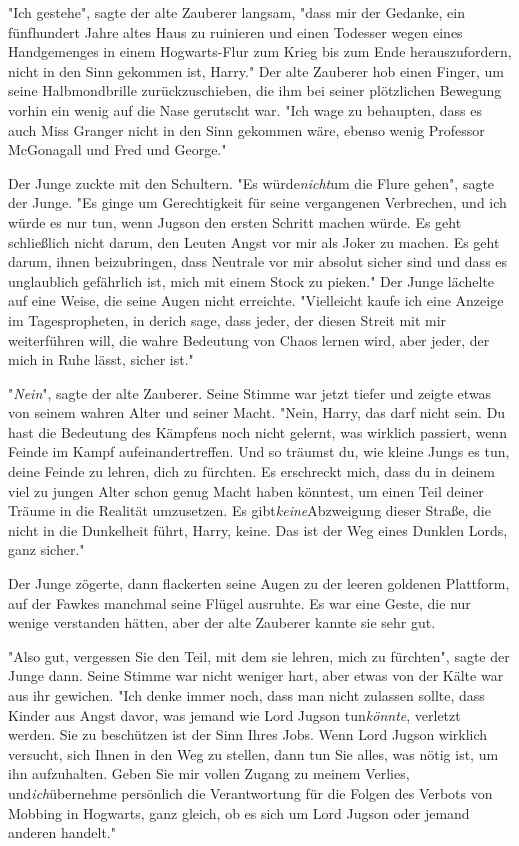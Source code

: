 {"Ich gestehe", sagte der alte Zauberer langsam, "dass mir der Gedanke, ein fünfhundert Jahre altes Haus zu ruinieren und einen Todesser wegen eines Handgemenges in einem Hogwarts-Flur zum Krieg bis zum Ende herauszufordern, nicht in den Sinn gekommen ist, Harry." Der alte Zauberer hob einen Finger, um seine Halbmondbrille zurückzuschieben, die ihm bei seiner plötzlichen Bewegung vorhin ein wenig auf die Nase gerutscht war. "Ich wage zu behaupten, dass es auch Miss Granger nicht in den Sinn gekommen wäre, ebenso wenig Professor McGonagall und Fred und George."

Der Junge zuckte mit den Schultern. "Es würde\emph{nicht}um die Flure gehen", sagte der Junge. "Es ginge um Gerechtigkeit für seine vergangenen Verbrechen, und ich würde es nur tun, wenn Jugson den ersten Schritt machen würde. Es geht schließlich nicht darum, den Leuten Angst vor mir als Joker zu machen. Es geht darum, ihnen beizubringen, dass Neutrale vor mir absolut sicher sind und dass es unglaublich gefährlich ist, mich mit einem Stock zu pieken." Der Junge lächelte auf eine Weise, die seine Augen nicht erreichte. "Vielleicht kaufe ich eine Anzeige im Tagespropheten, in derich sage, dass jeder, der diesen Streit mit mir weiterführen will, die wahre Bedeutung von Chaos lernen wird, aber jeder, der mich in Ruhe lässt, sicher ist."

"\emph{Nein}", sagte der alte Zauberer. Seine Stimme war jetzt tiefer und zeigte etwas von seinem wahren Alter und seiner Macht. "Nein, Harry, das darf nicht sein. Du hast die Bedeutung des Kämpfens noch nicht gelernt, was wirklich passiert, wenn Feinde im Kampf aufeinandertreffen. Und so träumst du, wie kleine Jungs es tun, deine Feinde zu lehren, dich zu fürchten. Es erschreckt mich, dass du in deinem viel zu jungen Alter schon genug Macht haben könntest, um einen Teil deiner Träume in die Realität umzusetzen. Es gibt\emph{keine}Abzweigung dieser Straße, die nicht in die Dunkelheit führt, Harry, keine. Das ist der Weg eines Dunklen Lords, ganz sicher."

Der Junge zögerte, dann flackerten seine Augen zu der leeren goldenen Plattform, auf der Fawkes manchmal seine Flügel ausruhte. Es war eine Geste, die nur wenige verstanden hätten, aber der alte Zauberer kannte sie sehr gut.

"Also gut, vergessen Sie den Teil, mit dem sie lehren, mich zu fürchten", sagte der Junge dann. Seine Stimme war nicht weniger hart, aber etwas von der Kälte war aus ihr gewichen. "Ich denke immer noch, dass man nicht zulassen sollte, dass Kinder aus Angst davor, was jemand wie Lord Jugson tun\emph{könnte}, verletzt werden. Sie zu beschützen ist der Sinn Ihres Jobs. Wenn Lord Jugson wirklich versucht, sich Ihnen in den Weg zu stellen, dann tun Sie alles, was nötig ist, um ihn aufzuhalten. Geben Sie mir vollen Zugang zu meinem Verlies, und\emph{ich}übernehme persönlich die Verantwortung für die Folgen des Verbots von Mobbing in Hogwarts, ganz gleich, ob es sich um Lord Jugson oder jemand anderen handelt."

}
